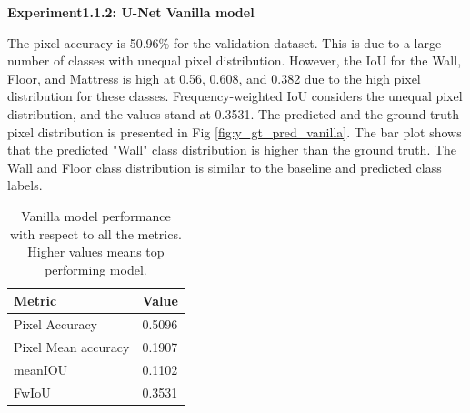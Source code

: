 	{ \bf Experiment1.1.2: U-Net Vanilla model}
	
	The pixel accuracy is 50.96\% for the validation dataset. This is due to a large number of classes with unequal pixel distribution. However, the IoU for the Wall, Floor, and Mattress is high at 0.56, 0.608, and 0.382 due to the high pixel distribution for these classes. Frequency-weighted IoU considers the unequal pixel distribution, and the values stand at 0.3531. The predicted and the ground truth pixel distribution is presented in Fig \ref{fig:y_gt_pred_vanilla}. The bar plot shows that the predicted "Wall" class distribution is higher than the ground truth. The Wall and Floor class distribution is similar to the baseline and predicted class labels. 
    
   	
   	\begin{table}
    \begin{center}
    	\begin{tabular}{ | l | p{12cm} |}
    		\hline
    		
    		\cellcolor{purple!30}Metric & \cellcolor{purple!30}Value \\ \hline
    		Pixel Accuracy & 0.5096 \\ \hline
    		Pixel Mean accuracy & 0.1907  \\ \hline
    		meanIOU & 0.1102 \\ \hline
    		FwIoU & 0.3531 \\ \hline
    		\hline
    	\end{tabular}
   		\caption{Vanilla model performance with respect to all the metrics. Higher values means top performing model.}
	    \label{tab:caption}
    \end{center}
	\end{table}
	
